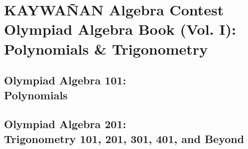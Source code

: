 \documentclass[12pt,a4paper]{memoir}
\theoremstyle{definition}
\begin{document}
\tableofcontents\label{TOC}
\listoffigures

\mainmatter

\pagestyle{fancy}
\fancyhf{}








\part{KAYWAÑAN Algebra Contest\\ Olympiad Algebra Book (Vol. I): \\ Polynomials \& Trigonometry}\label{part:VolI}
\chapter{Olympiad Algebra 101:\\ Polynomials}\label{ch:POLY}
\newpage

\newpage

\newpage

\newpage

\newpage

\newpage

\newpage

\newpage

\newpage

\chapter{Olympiad Algebra 201:\\ Trigonometry 101, 201, 301, 401, and Beyond}
\newpage

\end{document}
